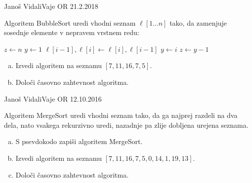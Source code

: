 \begin{naloga}{Janoš Vidali}{Vaje OR 21.2.2018}
\begin{vprasanje}
Algoritem {\sc BubbleSort} uredi vhodni seznam $\ell[1 \dots n]$ tako,
da zamenjuje sosednje elemente v nepravem vrstnem redu:
\begin{small}
\begin{algorithmic}
    \State $z \gets n$
        \State $y \gets 1$
            \If{$\ell[i-1] > \ell[i]$}
                \State $\ell[i-1], \ell[i] \gets \ell[i], \ell[i-1]$
                \State $y \gets i$
            \EndIf
        \EndFor
        \State $z \gets y-1$
    \EndWhile
\EndFunction
\end{algorithmic}
\end{small}

\begin{enumerate}[(a)]
\item Izvedi algoritem na seznamu $[7, 11, 16, 7, 5]$.
\item Določi časovno zahtevnost algoritma.
\end{enumerate}

\end{vprasanje}
\begin{odgovor}
\end{odgovor}
\end{naloga}


\begin{naloga}{Janoš Vidali}{Vaje OR 12.10.2016}
\begin{vprasanje}
Algoritem {\sc MergeSort} uredi vhodni seznam tako,
da ga najprej razdeli na dva dela,
nato vsakega rekurzivno uredi,
nazadnje pa zlije dobljena urejena seznama.
\begin{enumerate}[(a)]
\item S psevdokodo zapiši algoritem {\sc MergeSort}.
\item Izvedi algoritem na seznamu $[7, 11, 16, 7, 5, 0, 14, 1, 19, 13]$.
\item Določi časovno zahtevnost algoritma.
\end{enumerate}

\end{vprasanje}
\begin{odgovor}
\end{odgovor}
\end{naloga}


